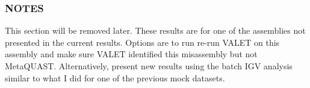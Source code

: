 \documentclass{article}
\begin{document}
\subsubsection{NOTES}
This section will be removed later. These results are for one of the assemblies not presented in the current results. 
Options are to run re-run VALET on this assembly and make sure VALET identified this misassembly but not MetaQUAST.  Alternatively, present new results using the batch IGV analysis similar to what I did for one of the previous mock datasets.










%


\end{document}
